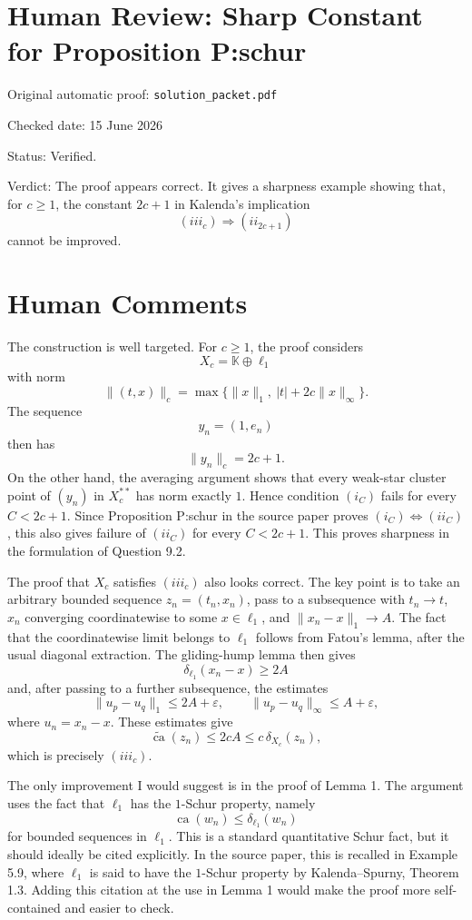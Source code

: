 \documentclass[11pt]{article}
\begin{document}
\section*{Human Review: Sharp Constant for Proposition P:schur}

\noindent Original automatic proof: \texttt{solution\_packet.pdf}

\noindent Checked date: 15 June 2026

\noindent Status: Verified.

\noindent Verdict: The proof appears correct. It gives a sharpness example showing that, for \(c\geq 1\), the constant \(2c+1\) in Kalenda's implication
\[
(iii_c)\Longrightarrow(ii_{2c+1})
\]
cannot be improved.

\section*{Human Comments}

The construction is well targeted. For \(c\geq1\), the proof considers
\[
X_c=\mathbb K\oplus\ell_1
\]
with norm
\[
\|(t,x)\|_c=\max\{\|x\|_1,\ |t|+2c\|x\|_\infty\}.
\]
The sequence
\[
y_n=(1,e_n)
\]
then has
\[
\|y_n\|_c=2c+1.
\]
On the other hand, the averaging argument shows that every weak-star cluster point of \((y_n)\) in \(X_c^{**}\) has norm exactly \(1\). Hence condition \((i_C)\) fails for every \(C<2c+1\). Since Proposition P:schur in the source paper proves \((i_C)\Longleftrightarrow(ii_C)\), this also gives failure of \((ii_C)\) for every \(C<2c+1\). This proves sharpness in the formulation of Question 9.2.

The proof that \(X_c\) satisfies \((iii_c)\) also looks correct. The key point is to take an arbitrary bounded sequence \(z_n=(t_n,x_n)\), pass to a subsequence with \(t_n\to t\), \(x_n\) converging coordinatewise to some \(x\in\ell_1\), and \(\|x_n-x\|_1\to A\). The fact that the coordinatewise limit belongs to \(\ell_1\) follows from Fatou's lemma, after the usual diagonal extraction. The gliding-hump lemma then gives
\[
\delta_{\ell_1}(x_n-x)\geq 2A
\]
and, after passing to a further subsequence, the estimates
\[
\|u_p-u_q\|_1\leq 2A+\varepsilon,
\qquad
\|u_p-u_q\|_\infty\leq A+\varepsilon,
\]
where \(u_n=x_n-x\). These estimates give
\[
\widetilde{\operatorname{ca}}(z_n)\leq 2cA
\leq c\,\delta_{X_c}(z_n),
\]
which is precisely \((iii_c)\).

The only improvement I would suggest is in the proof of Lemma 1. The argument uses the fact that \(\ell_1\) has the \(1\)-Schur property, namely
\[
\operatorname{ca}(w_n)\leq \delta_{\ell_1}(w_n)
\]
for bounded sequences in \(\ell_1\). This is a standard quantitative Schur fact, but it should ideally be cited explicitly. In the source paper, this is recalled in Example 5.9, where \(\ell_1\) is said to have the \(1\)-Schur property by Kalenda--Spurny, Theorem 1.3. Adding this citation at the use in Lemma 1 would make the proof more self-contained and easier to check.
\end{document}
